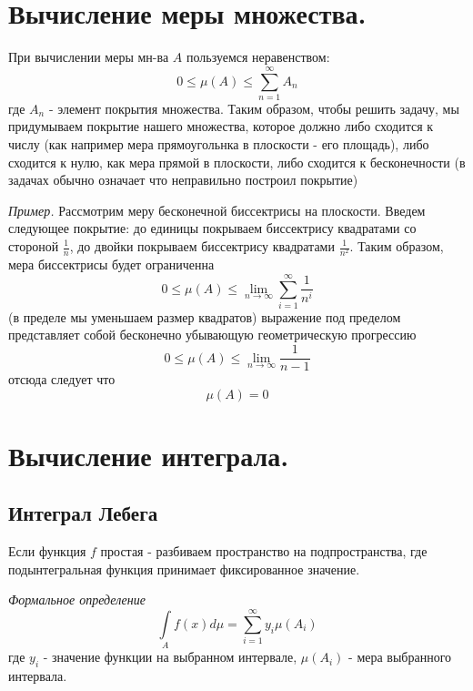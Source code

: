 \documentclass{article}[12pt]
\begin{document}
\tableofcontents
\pagebreak
\printindex
\pagebreak

\section{Вычисление меры множества.}
При вычислении меры мн-ва $A$ пользуемся неравенством:
\begin{displaymath}
    0 \leqslant \mu(A) \leqslant \sum\limits_{n=1}^{\infty}A_{n}
\end{displaymath}
где $A_{n}$ - элемент покрытия множества. Таким образом, чтобы решить
задачу, мы придумываем покрытие нашего множества, которое должно либо
сходится к числу (как например мера прямоугольнка в плоскости - его
площадь), либо сходится к нулю, как мера прямой в плоскости, либо
сходится к бесконечности (в задачах обычно означает что неправильно
построил покрытие)
\par \textit{Пример.} Рассмотрим меру бесконечной биссектрисы на
плоскости. Введем следующее покрытие: до единицы покрываем биссектрису
квадратами со стороной $\frac{1}{n}$, до двойки покрываем биссектрису
квадратами $\frac{1}{n^{2}}$. Таким образом, мера биссектрисы будет
ограниченна
\begin{displaymath}
    0 \leqslant \mu(A) \leqslant
    \lim\limits_{n\rightarrow \infty}\sum\limits_{i=1}^{\infty}\frac{1}{n^{i}}
\end{displaymath}
(в пределе мы уменьшаем размер квадратов) выражение под пределом представляет
собой бесконечно убывающую геометрическую прогрессию
\begin{displaymath}
    0 \leqslant \mu(A) \leqslant \lim\limits_{n\rightarrow
    \infty}\frac{1}{n-1}
\end{displaymath}
отсюда следует что
\begin{displaymath}
    \mu(A)=0
\end{displaymath}
\section{Вычисление интеграла.}
\subsection{Интеграл Лебега}
Если функция $f$ простая - разбиваем пространство на подпространства,
где подынтегральная функция принимает фиксированное значение.

\par \textit{Формальное определение}
\begin{displaymath}
    \int\limits_{A}f(x)d\mu=\sum\limits_{i=1}^{\infty}y_{i}\mu(A_{i})
\end{displaymath}
где $y_{i}$ - значение функции на выбранном интервале, $\mu(A_{i})$ -
мера выбранного интервала.
\end{document}
